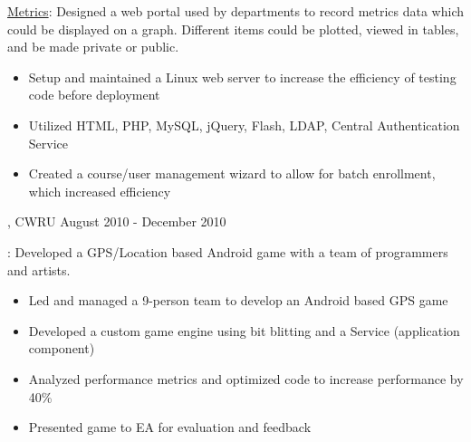 \documentclass[10pt, letterpaper]{article}
\begin{document}
\hangindent=15pt
 \underline{Metrics}: Designed a web portal used by departments to record metrics data which could be displayed on a graph. Different items could be plotted, viewed in tables, and be made private or public.

\begin{itemize}
\item Setup and maintained a Linux web server to increase the efficiency of testing code before deployment
\item Utilized HTML, PHP, MySQL, jQuery, Flash, LDAP,  Central Authentication Service
\item Created a course/user management wizard to allow for batch enrollment, which increased efficiency
\end{itemize}

\bigskip
{},   \hfill CWRU \hfill August 2010 - December 2010

\hangindent=15pt
: Developed a GPS/Location based Android game with a team of programmers and artists.

\begin{itemize}
\item Led and managed a 9-person team to develop an Android based GPS game
\item Developed a custom game engine using bit blitting and a Service (application component)
\item Analyzed performance metrics and optimized code to increase performance by 40\%
\item Presented game to EA for evaluation and feedback
\end{itemize}
\end{document}
